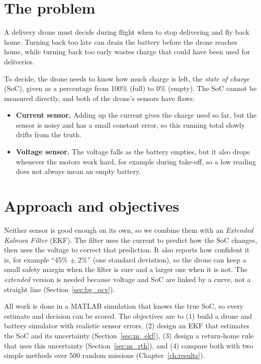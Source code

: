 
\section{The problem}\label{sec:intro_problem}

A delivery drone must decide during flight when to stop delivering and fly back home. Turning back too late can drain the battery before the drone reaches home, while turning back too early wastes charge that could have been used for deliveries.

To decide, the drone needs to know how much charge is left, the \emph{state of charge} (SoC), given as a percentage from 100\% (full) to 0\% (empty). The SoC cannot be measured directly, and both of the drone's sensors have flaws:
\begin{itemize}
  \item \textbf{Current sensor.} Adding up the current gives the charge used so far, but the sensor is noisy and has a small constant error, so this running total slowly drifts from the truth.
  \item \textbf{Voltage sensor.} The voltage falls as the battery empties, but it also drops whenever the motors work hard, for example during take-off, so a low reading does not always mean an empty battery.
\end{itemize}

\section{Approach and objectives}\label{sec:intro_why_ekf}\label{sec:intro_objectives}\label{sec:intro_contributions}

Neither sensor is good enough on its own, so we combine them with an \emph{Extended Kalman Filter} (EKF). The filter uses the current to predict how the SoC changes, then uses the voltage to correct that prediction. It also reports how confident it is, for example ``45\% $\pm$ 2\%'' (one standard deviation), so the drone can keep a small safety margin when the filter is sure and a larger one when it is not. The \emph{extended} version is needed because voltage and SoC are linked by a curve, not a straight line (Section~\ref{sec:bg_ocv}).

All work is done in a MATLAB simulation that knows the true SoC, so every estimate and decision can be scored. The objectives are to (1) build a drone and battery simulator with realistic sensor errors, (2) design an EKF that estimates the SoC and its uncertainty (Section~\ref{sec:m_ekf}), (3) design a return-home rule that uses this uncertainty (Section~\ref{sec:m_rth}), and (4) compare both with two simple methods over 500 random missions (Chapter~\ref{ch:results}).

